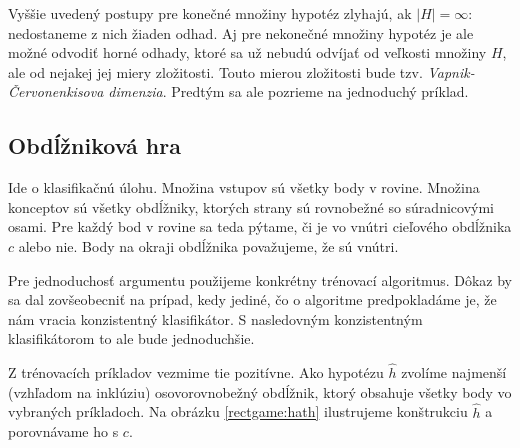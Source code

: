 Vyššie uvedený postupy pre konečné množiny hypotéz zlyhajú, ak
$|H| = \infty$: nedostaneme z nich žiaden odhad. Aj pre nekonečné
množiny hypotéz je ale možné odvodiť horné odhady, ktoré sa už nebudú
odvíjať od veľkosti množiny $H$, ale od nejakej jej miery zložitosti.
Touto mierou zložitosti bude tzv. \emph{Vapnik-Červonenkisova dimenzia}.
Predtým sa ale pozrieme na jednoduchý príklad.




\subsection{Obdĺžniková hra}

Ide o klasifikačnú úlohu. Množina vstupov sú všetky body v rovine.
Množina konceptov sú všetky obdĺžniky, ktorých strany sú rovnobežné
so súradnicovými osami. Pre každý bod v rovine sa teda pýtame, či je
vo vnútri cieľového obdĺžnika $c$ alebo nie. Body na okraji obdĺžnika
považujeme, že sú vnútri.

Pre jednoduchosť argumentu použijeme konkrétny trénovací algoritmus.
Dôkaz by sa dal zovšeobecniť na prípad, kedy jediné, čo o algoritme
predpokladáme je, že nám vracia konzistentný klasifikátor. S nasledovným
konzistentným klasifikátorom to ale bude jednoduchšie.

\medskip

Z trénovacích príkladov vezmime tie pozitívne. Ako hypotézu $\hat{h}$
zvolíme najmenší (vzhľadom na inklúziu) osovorovnobežný obdĺžnik,
ktorý obsahuje všetky body vo vybraných príkladoch. Na obrázku
\ref{rectgame:hath} ilustrujeme konštrukciu $\hat{h}$ a porovnávame
ho s $c$.


